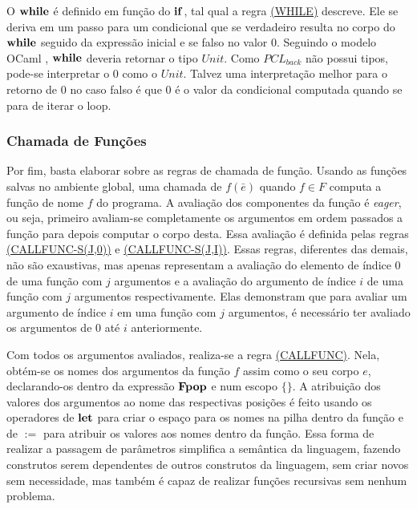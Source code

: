 O $\mathbf{while}$ é definido em função do $\mathbf{if}$, tal qual a regra \hyperref[rule:while1]{(WHILE)} descreve. Ele se deriva em um passo para um condicional que se verdadeiro resulta no corpo do $\mathbf{while}$ seguido da expressão inicial e se falso no valor 0. Seguindo o modelo OCaml \cite{leroy3ocaml}, $\mathbf{while}$ deveria retornar o tipo $Unit$. Como $PCL_{back}$ não possui tipos, pode-se interpretar o 0 como o $Unit$. Talvez uma interpretação melhor para o retorno de 0 no caso falso é que 0 é o valor da condicional computada quando se para de iterar o loop.

\subsubsection{Chamada de Funções}

Por fim, basta elaborar sobre as regras de chamada de função. Usando as funções salvas no ambiente global, uma chamada de $f(\bar e)$ quando $f \in F$ computa a função de nome $f$ do programa. A avaliação dos componentes da função é \emph{eager}, ou seja, primeiro avaliam-se completamente os argumentos em ordem passados a função para depois computar o corpo desta. Essa avaliação é definida pelas regras \hyperref[rule:callfunc-s(j,0)]{(CALLFUNC-S(J,0))} e \hyperref[rule:callfunc-s(j,i)]{(CALLFUNC-S(J,I))}. Essas regras, diferentes das demais, não são exaustivas, mas apenas representam a avaliação do elemento de índice 0 de uma função com $j$ argumentos e a avaliação do argumento de índice $i$ de uma função com $j$ argumentos respectivamente. Elas demonstram que para avaliar um argumento de índice $i$ em uma função com $j$ argumentos, é necessário ter avaliado os argumentos de 0 até $i$ anteriormente.

Com todos os argumentos avaliados, realiza-se a regra \hyperref[rule:callfunc]{(CALLFUNC)}. Nela, obtém-se os nomes dos argumentos da função $f$ assim como o seu corpo $e$, declarando-os dentro da expressão $\mathbf{Fpop}$ e num escopo $\{\}$. A atribuição dos valores dos argumentos ao nome das respectivas posições é feito usando os operadores de $\mathbf{let}$ para criar o espaço para os nomes na pilha dentro da função e de $:=$ para atribuir os valores aos nomes dentro da função. Essa forma de realizar a passagem de parâmetros simplifica a semântica da linguagem, fazendo construtos serem dependentes de outros construtos da linguagem, sem criar novos sem necessidade, mas também é capaz de realizar funções recursivas sem nenhum problema.



